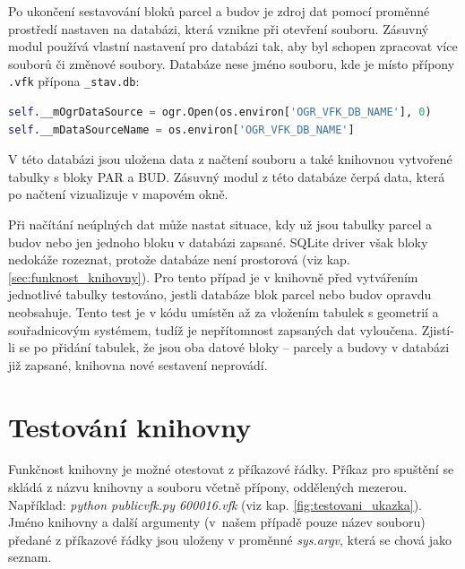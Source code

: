 Po ukončení sestavování bloků parcel a budov je zdroj dat pomocí
proměnné prostředí nastaven na databázi, která vznikne při otevření  souboru. Zásuvný modul používá vlastní nastavení pro databázi tak, aby byl schopen zpracovat více  souborů či změnové soubory. Databáze nese jméno  souboru, kde je
místo přípony \verb|.vfk| přípona \verb|_stav.db|: {\small
\begin{lstlisting}[language=Python, numbers=none]
self.__mOgrDataSource = ogr.Open(os.environ['OGR_VFK_DB_NAME'], 0)
self.__mDataSourceName = os.environ['OGR_VFK_DB_NAME']
\end{lstlisting}}

V této databázi jsou uložena data z načtení  souboru a také
knihovnou vytvořené tabulky s bloky PAR a BUD. Zásuvný modul z této
databáze čerpá data, která po načtení vizualizuje v mapovém okně.

Při načítání neúplných dat  může nastat situace, kdy už jsou
tabulky parcel a budov nebo jen jednoho bloku v databázi
zapsané. SQLite driver však bloky nedokáže rozeznat, protože databáze
není prostorová (viz kap. \ref{sec:funknost_knihovny}). Pro tento
případ je v knihovně před vytvářením jednotlivé tabulky testováno,
jestli databáze blok parcel nebo budov opravdu neobsahuje. Tento test
je v kódu umístěn až za vložením tabulek s geometrií a souřadnicovým
systémem, tudíž je nepřítomnost zapsaných dat vyloučena. Zjistí-li se
po přidání tabulek, že jsou oba datové bloky -- parcely a budovy v
databázi již zapsané, knihovna nové sestavení neprovádí.

\section{Testování knihovny}

Funkčnost knihovny je možné otestovat z příkazové řádky.
 Příkaz pro spuštění se skládá z názvu knihovny a
 souboru včetně přípony, oddělených mezerou. Například:
\textit{python publicvfk.py 600016.vfk} (viz
kap. \ref{fig:testovani_ukazka}). Jméno knihovny a další argumenty
(v~našem případě pouze název  souboru) předané z příkazové
řádky jsou uloženy v proměnné \textit{sys.argv}, která se chová jako
seznam.

